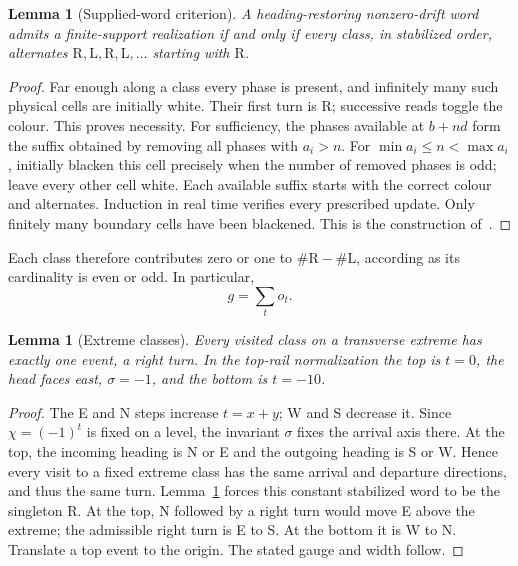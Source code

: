 \documentclass[11pt]{article}
\newtheorem{lemma}[theorem]{Lemma}
\theoremstyle{definition}\newtheorem{definition}[theorem]{Definition}
\newcommand{\Rr}{\mathrm R}
\newcommand{\Ll}{\mathrm L}
\begin{document}
\begin{lemma}[Supplied-word criterion]\label{lem:criterion}
A heading-restoring nonzero-drift word admits a finite-support realization if
and only if every class, in stabilized order, alternates
$\Rr,\Ll,\Rr,\Ll,\ldots$ starting with $\Rr$.
\end{lemma}
\begin{proof}
Far enough along a class every phase is present, and infinitely many such
physical cells are initially white. Their first turn is $\Rr$; successive
reads toggle the colour. This proves necessity.
For sufficiency, the phases available at $b+n d$ form the suffix obtained by
removing all phases with $a_i>n$. For
$\min a_i\le n<\max a_i$, initially blacken this cell precisely when the
number of removed phases is odd; leave every other cell white. Each available
suffix starts with the correct colour and alternates. Induction in real time
verifies every prescribed update. Only finitely many boundary cells have been
blackened. This is the construction of~\cite[Section~3, ``Periodic-realisability criterion'']{Jillhewar2026}.
\end{proof}

Each class therefore contributes zero or one to $\#\Rr-\#\Ll$, according as
its cardinality is even or odd. In particular,
\begin{equation}\label{eq:growth}g=\sum_t o_t.\end{equation}

\begin{lemma}[Extreme classes]\label{lem:rails}
Every visited class on a transverse extreme has exactly one event, a right
turn. In the top-rail normalization the top is $t=0$, the head faces east,
$\sigma=-1$, and the bottom is $t=-10$.
\end{lemma}
\begin{proof}
The E and N steps increase $t=x+y$; W and S decrease it. Since
$\chi=(-1)^t$ is fixed on a level, the invariant $\sigma$ fixes the arrival
axis there. At the top, the incoming heading is N or E and the outgoing
heading is S or W. Hence every visit to a fixed
extreme class has the same arrival and departure directions, and thus the
same turn. Lemma~\ref{lem:criterion} forces this constant stabilized word to
be the singleton $\Rr$. At the top, N followed by a right turn would move E above the extreme;
the admissible right turn is E to S. At the bottom it is W to N. Translate a top event to the
origin. The stated gauge and width follow.
\end{proof}
\end{document}
